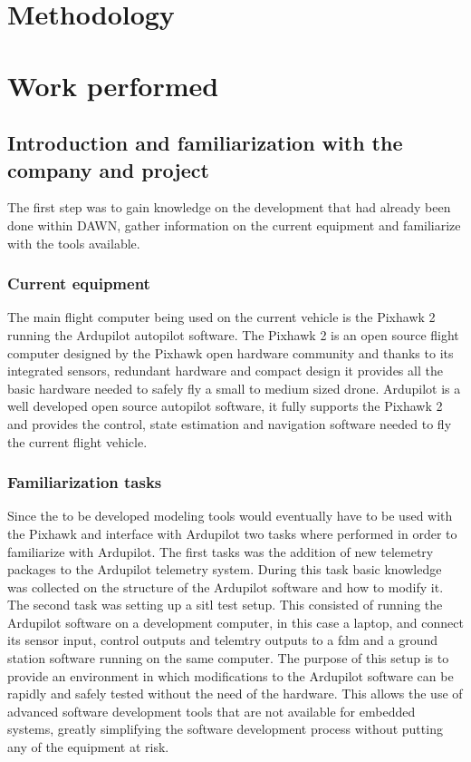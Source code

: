 \section{Methodology}

\section{Work performed}
\subsection{Introduction and familiarization with the company and project}
The first step was to gain knowledge on the development that had already been done within DAWN, gather information on the current equipment and familiarize with the tools available.

\subsubsection{Current equipment}
The main flight computer being used on the current vehicle is the Pixhawk 2 running the Ardupilot autopilot software. The Pixhawk 2 is an open source flight computer designed by the Pixhawk open hardware community and thanks to its integrated sensors, redundant hardware and compact design it provides all the basic hardware needed to safely fly a small to medium sized drone. Ardupilot is a well developed open source autopilot software, it fully supports the Pixhawk 2 and provides the control, state estimation and navigation software needed to fly the current flight vehicle.

\subsubsection{Familiarization tasks}
Since the to be developed modeling tools would eventually have to be used with the Pixhawk and interface with Ardupilot two tasks where performed in order to familiarize with Ardupilot. The first tasks was the addition of new telemetry packages to the Ardupilot telemetry system. During this task basic knowledge was collected on the structure of the Ardupilot software and how to modify it. \\

The second task was setting up a \gls{sitl} test setup. This consisted of running the Ardupilot software on a development computer, in this case a laptop, and connect its sensor input, control outputs and telemtry outputs to a \gls{fdm} and a ground station software running on the same computer. The purpose of this setup is to provide an environment in which modifications to the Ardupilot software can be rapidly and safely tested without the need of the hardware. This allows the use of advanced software development tools that are not available for embedded systems, greatly simplifying the software development process without putting any of the equipment at risk. \\

